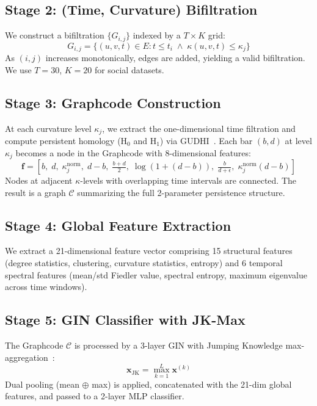 \documentclass[conference]{IEEEtran}
\begin{document}
\subsection{Stage 2: (Time, Curvature) Bifiltration}
We construct a bifiltration $\{G_{i,j}\}$ indexed by a $T\times K$ grid:
\begin{equation}
    G_{i,j} = \bigl\{(u,v,t)\in E : t \leq t_i \;\wedge\; \kappa(u,v,t) \leq \kappa_j\bigr\}
\end{equation}
As $(i,j)$ increases monotonically, edges are added, yielding a valid
bifiltration. We use $T{=}30$, $K{=}20$ for social datasets.

\subsection{Stage 3: Graphcode Construction}
At each curvature level $\kappa_j$, we extract the one-dimensional
time filtration and compute persistent homology (H$_0$ and H$_1$) via
GUDHI~\cite{gudhi}. Each bar $(b,d)$ at level $\kappa_j$ becomes a node
in the Graphcode with 8-dimensional features:
\begin{equation}
    \mathbf{f} = [b,\; d,\; \kappa_j^\text{norm},\; d{-}b,\;
                  \tfrac{b+d}{2},\; \log(1{+}(d{-}b)),\;
                  \tfrac{b}{d+\epsilon},\; \kappa_j^\text{norm}(d{-}b)]
\end{equation}
Nodes at adjacent $\kappa$-levels with overlapping time intervals are
connected. The result is a graph $\mathcal{C}$ summarizing the full
2-parameter persistence structure.

\subsection{Stage 4: Global Feature Extraction}
We extract a 21-dimensional feature vector comprising 15 structural
features (degree statistics, clustering, curvature statistics, entropy)
and 6 temporal spectral features (mean/std Fiedler value, spectral
entropy, maximum eigenvalue across time windows).

\subsection{Stage 5: GIN Classifier with JK-Max}
The Graphcode $\mathcal{C}$ is processed by a 3-layer GIN with
Jumping Knowledge max-aggregation~\cite{xu2018jk}:
\begin{equation}
    \mathbf{x}_\text{JK} = \max_{k=1}^{L} \mathbf{x}^{(k)}
\end{equation}
Dual pooling (mean $\oplus$ max) is applied, concatenated with the
21-dim global features, and passed to a 2-layer MLP classifier.
\end{document}
